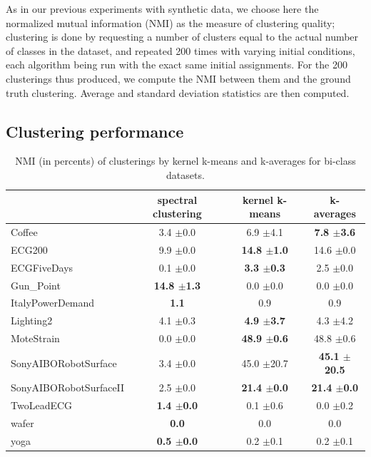 \documentclass[natbib,smallextended]{svjour3}
\begin{document}
As in our previous experiments with synthetic data, we choose here the normalized mutual information (NMI) as the measure of clustering quality; clustering is done by requesting a number of clusters equal to the actual number of classes in the dataset, and repeated 200 times with varying initial conditions, each algorithm being run with the exact same initial assignments. For the 200 clusterings thus produced, we compute the NMI between them and the ground truth clustering. Average and standard deviation statistics are then computed.

\subsection{Clustering performance}


\begin{table}
\begin{center}
\caption{NMI (in percents) of clusterings by kernel k-means and k-averages for bi-class datasets.}
\label{tab:results-2}
\begin{tabular}{lccc}
 & spectral clustering & kernel k-means & k-averages \\
\hline
Coffee & 3.4 $\pm$0.0 & 6.9 $\pm$4.1 & \textbf{7.8 $\pm$3.6} \\
ECG200 &  9.9 $\pm$0.0 & \textbf{14.8 $\pm$1.0} & 14.6 $\pm$0.0 \\
ECGFiveDays & 0.1 $\pm$0.0 & \textbf{3.3 $\pm$0.3} & 2.5 $\pm$0.0 \\
Gun\_Point & \textbf{14.8 $\pm$1.3} &  0.0 $\pm$0.0 &  0.0 $\pm$0.0 \\
ItalyPowerDemand & \textbf{1.1} & 0.9 & 0.9 \\
Lighting2 & 4.1 $\pm$0.3 & \textbf{4.9 $\pm$3.7} & 4.3 $\pm$4.2 \\
MoteStrain &  0.0 $\pm$0.0 & \textbf{48.9 $\pm$0.6} & 48.8 $\pm$0.6 \\
SonyAIBORobotSurface &   3.4 $\pm$0.0 & 45.0 $\pm$20.7 & \textbf{45.1 $\pm$20.5} \\
SonyAIBORobotSurfaceII &  2.5 $\pm$0.0 & \textbf{21.4 $\pm$0.0} & \textbf{21.4 $\pm$0.0} \\
TwoLeadECG & \textbf{1.4 $\pm$0.0} & 0.1 $\pm$0.6 & 0.0 $\pm$0.2 \\
wafer & \textbf{0.0} & 0.0 & 0.0 \\
yoga & \textbf{0.5 $\pm$0.0} & 0.2 $\pm$0.1 & 0.2 $\pm$0.1 \\
\end{tabular}
\end{center}
\end{table}
\end{document}
